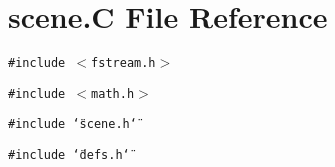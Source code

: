 \section{scene.C File Reference}
\label{scene_C}
{\tt \#include $<$fstream.h$>$}\par
{\tt \#include $<$math.h$>$}\par
{\tt \#include \char`\"{}scene.h\char`\"{}}\par
{\tt \#include \char`\"{}defs.h\char`\"{}}\par
